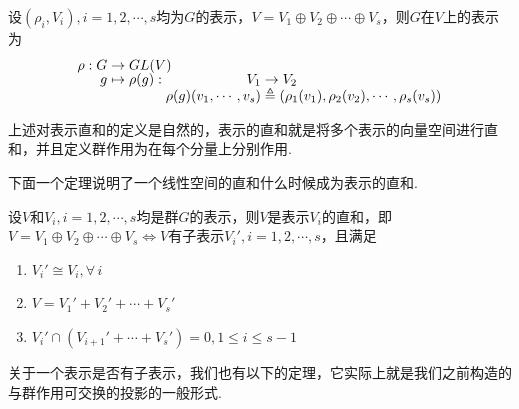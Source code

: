 \begin{definition}
    设$(\rho_i,V_i),i=1,2,\cdots,s$均为$G$的表示，$V=V_1\oplus V_2\oplus\cdots\oplus V_s$，则$G$在$V$上的表示为
    \[\setjot[-2]\begin{aligned}[t]
        \rho:G&\to GL(V) \\
        g&\mapsto \rho(g):\setjot[-2]\begin{aligned}[t]
            V_1 &\to V_2 \\
            \rho(g)(v_1,\cdots,v_s)&\triangleq \left(\rho_1(v_1),\rho_2(v_2),\cdots,\rho_s(v_s)\right)
        \end{aligned}
    \end{aligned}\]
\end{definition}

上述对表示直和的定义是自然的，表示的直和就是将多个表示的向量空间进行直和，并且定义群作用为在每个分量上分别作用.\par
下面一个定理说明了一个线性空间的直和什么时候成为表示的直和.
\begin{theorem}[][thm:1,3]
    设$V$和$V_i,i=1,2,\cdots,s$均是群$G$的表示，则$V$是表示$V_i$的直和，即$V=V_1\oplus V_2\oplus\cdots \oplus V_s$$\iff$$V$有子表示$V_i',i=1,2,\cdots,s$，且满足
    \begin{enumerate}[label=(\roman*)]
        \item $V_i'\cong V_i,\forall\, i$
        \item $V=V_1'+V_2'+\cdots+V_s'$
        \item $V_i'\cap \left(V_{i+1}'+\cdots+V_s'\right)=0,1\leq i\leq s-1$
    \end{enumerate}
\end{theorem}

关于一个表示是否有子表示，我们也有以下的定理，它实际上就是我们之前构造的与群作用可交换的投影的一般形式.


